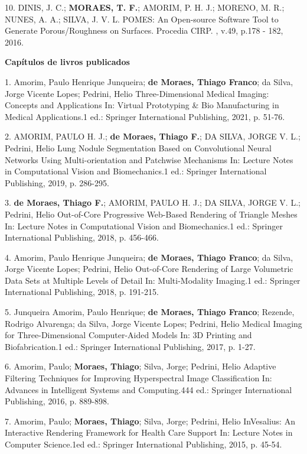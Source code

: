 10. DINIS, J. C.; \textbf{MORAES, T. F.}; AMORIM, P. H. J.; MORENO, M.
R.; NUNES, A. A.; SILVA, J. V. L.
POMES: An Open-source Software Tool to Generate Porous/Roughness on
Surfaces. Procedia CIRP. , v.49, p.178 - 182, 2016.

\textbf{Capítulos de livros publicados}

1. Amorim, Paulo Henrique Junqueira; \textbf{de Moraes, Thiago Franco};
da Silva, Jorge Vicente Lopes; Pedrini, Helio
Three-Dimensional Medical Imaging: Concepts and Applications In: Virtual
Prototyping \& Bio Manufacturing in Medical Applications.1 ed.: Springer
International Publishing, 2021, p. 51-76.

2. AMORIM, PAULO H. J.; \textbf{de Moraes, Thiago F.}; DA SILVA, JORGE
V. L.; Pedrini, Helio
Lung Nodule Segmentation Based on Convolutional Neural Networks Using
Multi-orientation and Patchwise Mechanisms In: Lecture Notes in
Computational Vision and Biomechanics.1 ed.: Springer International
Publishing, 2019, p. 286-295.

3. \textbf{de Moraes, Thiago F.}; AMORIM, PAULO H. J.; DA SILVA, JORGE
V. L.; Pedrini, Helio
Out-of-Core Progressive Web-Based Rendering of Triangle Meshes In:
Lecture Notes in Computational Vision and Biomechanics.1 ed.: Springer
International Publishing, 2018, p. 456-466.

4. Amorim, Paulo Henrique Junqueira; \textbf{de Moraes, Thiago Franco};
da Silva, Jorge Vicente Lopes; Pedrini, Helio
Out-of-Core Rendering of Large Volumetric Data Sets at Multiple Levels
of Detail In: Multi-Modality Imaging.1 ed.: Springer International
Publishing, 2018, p. 191-215.

5. Junqueira Amorim, Paulo Henrique; \textbf{de Moraes, Thiago Franco};
Rezende, Rodrigo Alvarenga; da Silva, Jorge Vicente Lopes; Pedrini,
Helio
Medical Imaging for Three-Dimensional Computer-Aided Models In: 3D
Printing and Biofabrication.1 ed.: Springer International Publishing,
2017, p. 1-27.

6. Amorim, Paulo; \textbf{Moraes, Thiago}; Silva, Jorge; Pedrini, Helio
Adaptive Filtering Techniques for Improving Hyperspectral Image
Classification In: Advances in Intelligent Systems and Computing.444
ed.: Springer International Publishing, 2016, p. 889-898.

7. Amorim, Paulo; \textbf{Moraes, Thiago}; Silva, Jorge; Pedrini, Helio
InVesalius: An Interactive Rendering Framework for Health Care Support
In: Lecture Notes in Computer Science.1ed ed.: Springer International
Publishing, 2015, p. 45-54.

